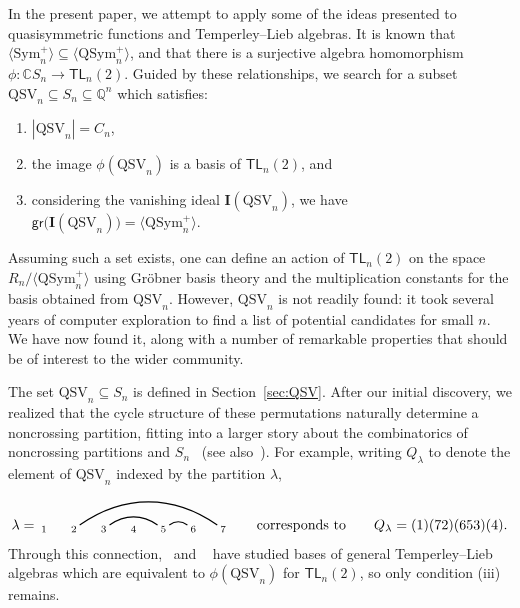 \documentclass[12pt]{amsart}
\theoremstyle{definition}
\theoremstyle{remark}
\numberwithin{equation}{section}
\newcommand{\CC}{\mathbb{C}}
\newcommand{\QQ}{\mathbb{Q}}
\newcommand{\TL}{\mathsf{TL}}
\newcommand{\Sym}{\mathrm{Sym}}
\newcommand{\QSym}{\mathrm{QSym}}
\newcommand{\QSV}{\mathrm{QSV}}
\begin{document}
In the present paper, we attempt to apply some of the ideas presented to quasisymmetric functions and Temperley--Lieb algebras. 
It is known  that $\langle \Sym_{n}^{+} \rangle \subseteq \langle \QSym_{n}^{+} \rangle$, and that there is a surjective algebra homomorphism $\phi: \CC S_{n} \to \TL_{n}(2)$. 
Guided by these relationships, we search for a subset $\QSV_{n} \subseteq S_{n} \subseteq \QQ^{n}$ which satisfies:
\begin{enumerate}[itemsep = 1ex, label=(\roman*)]
\item $|\QSV_{n}| = C_{n}$,

\item the image $\phi(\QSV_{n})$ is a basis of $\TL_{n}(2)$, and

\item considering the vanishing ideal $\mathbf{I}(\QSV_{n})$, we have $\mathsf{gr}\big(\mathbf{I}(\QSV_{n})\big) = \langle \QSym_{n}^{+} \rangle$.

\end{enumerate}
Assuming such a set exists, one can define an action of $\TL_{n}(2)$ on the space $R_{n}/\langle \QSym_{n}^{+} \rangle$ using Gr\"{o}bner basis theory and the multiplication constants for the basis obtained from $\QSV_{n}$.  
However, $\QSV_{n}$ is not readily found: it took several years of computer exploration to find a list of potential candidates for small $n$.  
We have now found it, along with a number of remarkable properties that should be of interest to the wider community.

The set $\QSV_{n} \subseteq S_{n}$ is defined in Section~\ref{sec:QSV}.  
After our initial discovery, we realized that the cycle structure of these permutations naturally determine a noncrossing partition, fitting into a larger story about the combinatorics of noncrossing partitions and $S_{n}$~\cite{Baine} (see also~\cite{McCammond}).  
For example, writing $Q_{\lambda}$ to denote the element of $\QSV_{n}$ indexed by the partition $\lambda$,
\[
\lambda = \begin{tikzpicture}[scale = 0.75, baseline = 0.75*-0.2]
\foreach \x in {1, ..., 7}{\draw[fill] (\x - 1, 0) node[inner sep = 2pt] (\x) {$\scriptstyle \x$};}
\foreach \i\j in {5/6, 3/5,2/7}{\draw[thick] (\i) to[out = 35, in = 145] (\j);}
\end{tikzpicture}
\qquad\text{corresponds to}\qquad
Q_{\lambda} = (1)(72)(653)(4).
\]
Through this connection,~\cite{GobetWilliams} and ~\cite{Zinno} have studied bases of general Temperley--Lieb algebras which are equivalent to $\phi(\QSV_{n})$ for $\TL_{n}(2)$, so only condition (iii) remains.
\end{document}

